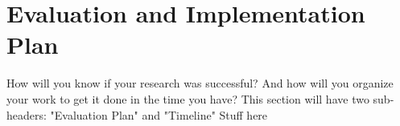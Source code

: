 \documentclass[12pt]{article}
\begin{document}
\section{Evaluation and Implementation Plan}
How will you know if your research was successful?  And how will you organize your work to get it done in the time you have?  This section will have two sub-headers: "Evaluation Plan" and "Timeline"
Stuff here



\end{document}

